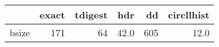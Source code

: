 \begin{tabular}{lrrrrr}
\toprule
{} &  exact &  tdigest &   hdr &   dd &  circllhist \\
\midrule
bsize &    171 &       64 &  42.0 &  605 &        12.0 \\
\bottomrule
\end{tabular}
